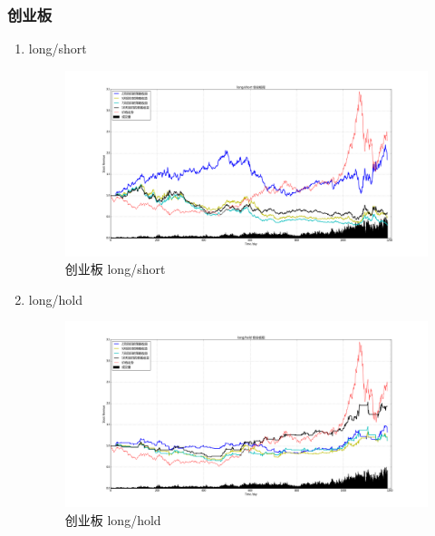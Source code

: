 \documentclass[12pt,a4paper]{article}
\begin{document}
\subsubsection{创业板}
\begin{enumerate}
\item long/short 
\begin{figure}[H]
	\centering
	\includegraphics[width=1.0\textwidth]{img_r_5/cyb.png}
	\caption{创业板 long/short}
\end{figure}
\item long/hold 
\begin{figure}[H]
	\centering
	\includegraphics[width=1.0\textwidth]{img_r_5/cyb_1.png}
	\caption{创业板 long/hold }
\end{figure}
\end{enumerate}
\end{document}
